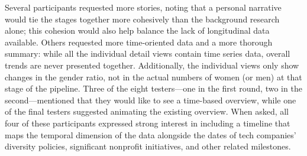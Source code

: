 Several participants requested more stories, noting that a personal narrative would tie the stages together more cohesively than the background research alone; this cohesion would also help balance the lack of longitudinal data available. Others requested more time-oriented data and a more thorough summary: while all the individual detail views contain time series data, overall trends are never presented together. Additionally, the individual views only show changes in the gender ratio, not in the actual numbers of women (or men) at that stage of the pipeline. Three of the eight testers---one in the first round, two in the second---mentioned that they would like to see a time-based overview, while one of the final testers suggested animating the existing overview. When asked, all four of these participants expressed strong interest in including a timeline that maps the temporal dimension of the data alongside the dates of tech companies' diversity policies, significant nonprofit initiatives, and other related milestones.
